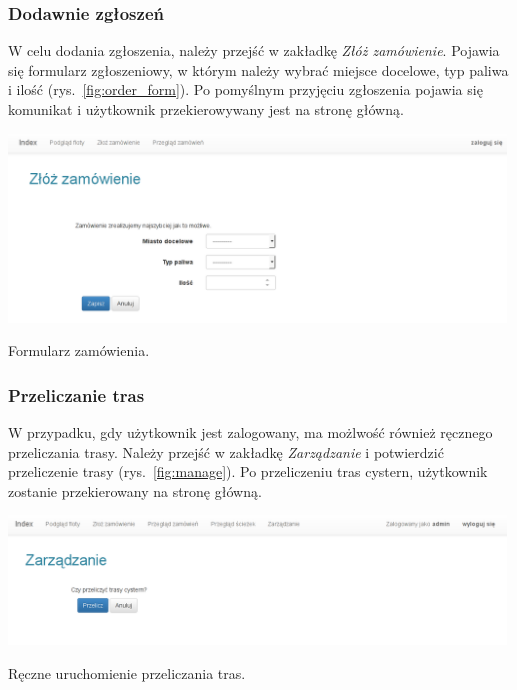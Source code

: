 \documentclass[11pt,a4paper,oneside]{mwart}
\begin{document}
\subsubsection{Dodawnie zgłoszeń}
W celu dodania zgłoszenia, należy przejść w zakładkę \emph{Złóż zamówienie}. Pojawia się formularz zgłoszeniowy, w którym należy wybrać miejsce docelowe, typ paliwa i ilość (rys.~\ref{fig:order_form}). Po pomyślnym przyjęciu zgłoszenia pojawia się komunikat i użytkownik przekierowywany jest na stronę główną.

\begin{wykres}[htbp]
  \centering
  \includegraphics[width=0.99\textwidth]{pics/order_form.png}
  \caption{Formularz zamówienia.}
  \label{fig:order_form}
\end{wykres}

\subsubsection{Przeliczanie tras}
W przypadku, gdy użytkownik jest zalogowany, ma możlwość również ręcznego przeliczania trasy. Należy przejść w zakładkę \emph{Zarządzanie} i potwierdzić przeliczenie trasy (rys.~\ref{fig:manage}). Po przeliczeniu tras cystern, użytkownik zostanie przekierowany na stronę główną.
\begin{wykres}[htbp]
  \centering
  \includegraphics[width=0.99\textwidth]{pics/manage.png}
  \caption{Ręczne uruchomienie przeliczania tras.}
  \label{fig:manage}
\end{wykres}
\end{document}
